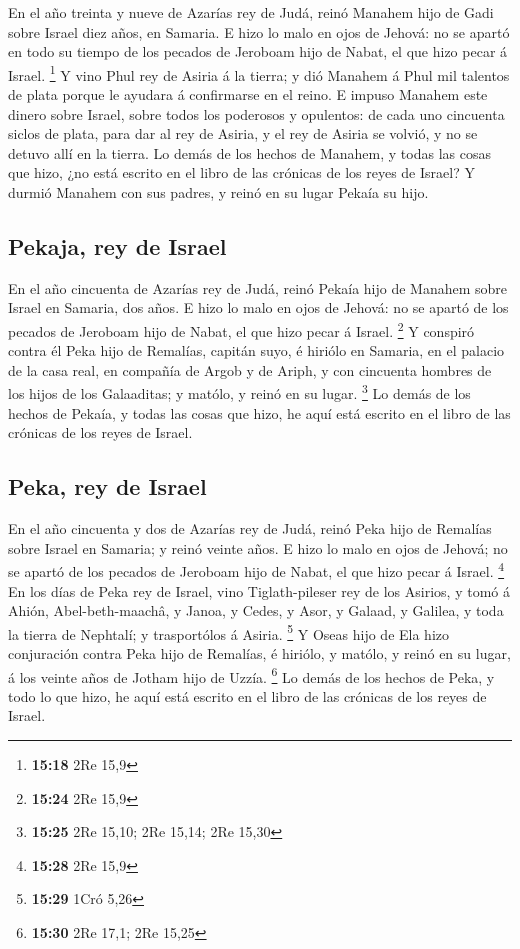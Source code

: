  En el año treinta y nueve de Azarías rey de Judá, reinó
Manahem hijo de Gadi sobre Israel diez años, en Samaria.  E
hizo lo malo en ojos de Jehová: no se apartó en todo su tiempo de los
pecados de Jeroboam hijo de Nabat, el que hizo pecar á Israel.
\footnote{\textbf{15:18} 2Re 15,9}  Y vino Phul rey de
Asiria á la tierra; y dió Manahem á Phul mil talentos de plata porque le
ayudara á confirmarse en el reino.  E impuso Manahem este
dinero sobre Israel, sobre todos los poderosos y opulentos: de cada uno
cincuenta siclos de plata, para dar al rey de Asiria, y el rey de Asiria
se volvió, y no se detuvo allí en la tierra.  Lo demás de
los hechos de Manahem, y todas las cosas que hizo, ¿no está escrito en
el libro de las crónicas de los reyes de Israel?  Y durmió
Manahem con sus padres, y reinó en su lugar Pekaía su hijo.

\hypertarget{pekaja-rey-de-israel}{%
\subsection{Pekaja, rey de Israel}\label{pekaja-rey-de-israel}}

 En el año cincuenta de Azarías rey de Judá, reinó Pekaía
hijo de Manahem sobre Israel en Samaria, dos años.  E hizo
lo malo en ojos de Jehová: no se apartó de los pecados de Jeroboam hijo
de Nabat, el que hizo pecar á Israel. \footnote{\textbf{15:24} 2Re 15,9}
 Y conspiró contra él Peka hijo de Remalías, capitán suyo,
é hiriólo en Samaria, en el palacio de la casa real, en compañía de
Argob y de Ariph, y con cincuenta hombres de los hijos de los
Galaaditas; y matólo, y reinó en su lugar. \footnote{\textbf{15:25} 2Re
  15,10; 2Re 15,14; 2Re 15,30}  Lo demás de los hechos de
Pekaía, y todas las cosas que hizo, he aquí está escrito en el libro de
las crónicas de los reyes de Israel.

\hypertarget{peka-rey-de-israel}{%
\subsection{Peka, rey de Israel}\label{peka-rey-de-israel}}

 En el año cincuenta y dos de Azarías rey de Judá, reinó
Peka hijo de Remalías sobre Israel en Samaria; y reinó veinte años.
 E hizo lo malo en ojos de Jehová; no se apartó de los
pecados de Jeroboam hijo de Nabat, el que hizo pecar á Israel.
\footnote{\textbf{15:28} 2Re 15,9}  En los días de Peka rey
de Israel, vino Tiglath-pileser rey de los Asirios, y tomó á Ahión,
Abel-beth-maachâ, y Janoa, y Cedes, y Asor, y Galaad, y Galilea, y toda
la tierra de Nephtalí; y trasportólos á Asiria. \footnote{\textbf{15:29}
  1Cró 5,26}  Y Oseas hijo de Ela hizo conjuración contra
Peka hijo de Remalías, é hiriólo, y matólo, y reinó en su lugar, á los
veinte años de Jotham hijo de Uzzía. \footnote{\textbf{15:30} 2Re 17,1;
  2Re 15,25}  Lo demás de los hechos de Peka, y todo lo que
hizo, he aquí está escrito en el libro de las crónicas de los reyes de
Israel.

